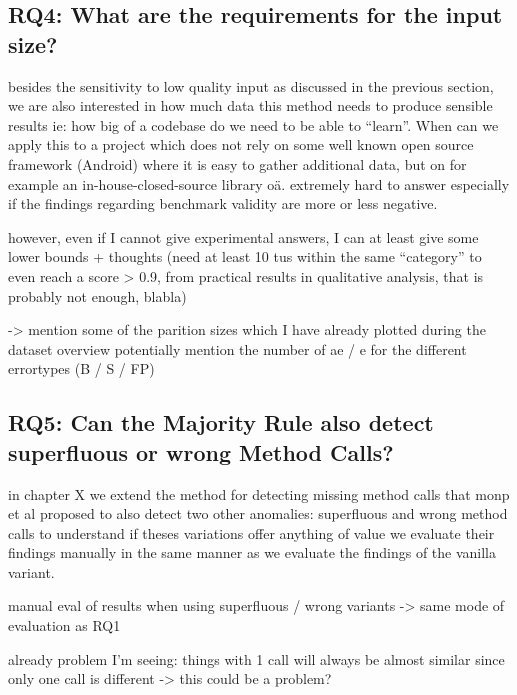 \subsection{RQ4: What are the requirements for the input size?}

besides the sensitivity to low quality input as discussed in the previous section, we are also interested in how much data this method needs to produce sensible results
ie: how big of a codebase do we need to be able to ``learn''. When can we apply this to a project which does not rely on some well known open source framework (Android) where it is easy to gather additional data, but on for example an in-house-closed-source library oä.
extremely hard to answer especially if the findings regarding benchmark validity are more or less negative.

however, even if I cannot give experimental answers, I can at least give some lower bounds + thoughts
(need at least 10 tus within the same ``category'' to even reach a score > 0.9, from practical results in qualitative analysis, that is probably not enough, blabla)

-> mention some of the parition sizes which I have already plotted during the dataset overview
potentially mention the number of ae / e for the different errortypes (B / S / FP)

\subsection{RQ5: Can the Majority Rule also detect superfluous or wrong Method Calls?}

in chapter X we extend the method for detecting missing method calls that monp et al proposed to also detect two other anomalies:
superfluous and wrong method calls
to understand if theses variations offer anything of value we evaluate their findings manually in the same manner as we evaluate the findings of the vanilla variant.

manual eval of results when using superfluous / wrong variants
-> same mode of evaluation as RQ1

already problem I'm seeing: things with 1 call will always be almost similar since only one call is different
 -> this could be a problem?

